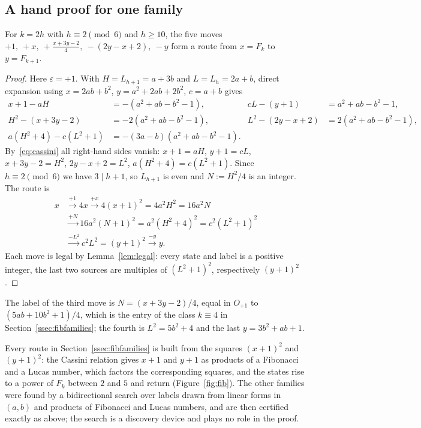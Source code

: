 \subsection{A hand proof for one family}
\begin{theorem}\label{thm:famA}
For $k=2h$ with $h\equiv2\pmod6$ and $h\ge10$, the five moves $+1,\ +x,\ +\tfrac{x+3y-2}{4},\ -(2y-x+2),\ -y$ form a route from $x=F_k$ to $y=F_{k+1}$.
\end{theorem}
\begin{proof}
Here $\varepsilon=+1$. With $H=L_{h+1}=a+3b$ and $L=L_h=2a+b$, direct expansion using $x=2ab+b^2$, $y=a^2+2ab+2b^2$, $c=a+b$ gives
\begin{align*}
x+1-aH&=-(a^2+ab-b^2-1), & cL-(y+1)&=a^2+ab-b^2-1,\\
H^2-(x+3y-2)&=-2(a^2+ab-b^2-1), & L^2-(2y-x+2)&=2(a^2+ab-b^2-1),\\
a(H^2+4)-c(L^2+1)&=-(3a-b)(a^2+ab-b^2-1).
\end{align*}
By~\eqref{eq:cassini} all right-hand sides vanish: $x+1=aH$, $y+1=cL$, $x+3y-2=H^2$, $2y-x+2=L^2$, $a(H^2+4)=c(L^2+1)$. Since $h\equiv2\pmod6$ we have $3\mid h+1$, so $L_{h+1}$ is even and $N:=H^2/4$ is an integer. The route is
\begin{align*}
x&\xrightarrow{+1}4x\xrightarrow{+x}4(x+1)^2=4a^2H^2=16a^2N\\
&\xrightarrow{+N}16a^2(N+1)^2=a^2(H^2+4)^2=c^2(L^2+1)^2\\
&\xrightarrow{-L^2}c^2L^2=(y+1)^2\xrightarrow{-y}y.
\end{align*}
Each move is legal by Lemma~\ref{lem:legal}: every state and label is a positive integer, the last two sources are multiples of $(L^2+1)^2$, respectively $(y+1)^2$. \end{proof}
The label of the third move is $N=(x+3y-2)/4$, equal in $O_{+1}$ to $(5ab+10b^2+1)/4$, which is the entry of the class $k\equiv4$ in Section~\ref{ssec:fibfamilies}; the fourth is $L^2=5b^2+4$ and the last $y=3b^2+ab+1$.
\begin{remark}[Mechanism]
Every route in Section~\ref{ssec:fibfamilies} is built from the squares $(x+1)^2$ and $(y+1)^2$: the Cassini relation gives $x+1$ and $y+1$ as products of a Fibonacci and a Lucas number, which factors the corresponding squares, and the states rise to a power of $F_k$ between $2$ and $5$ and return (Figure~\ref{fig:fib}). The other families were found by a bidirectional search over labels drawn from linear forms in $(a,b)$ and products of Fibonacci and Lucas numbers, and are then certified exactly as above; the search is a discovery device and plays no role in the proof.
\end{remark}

